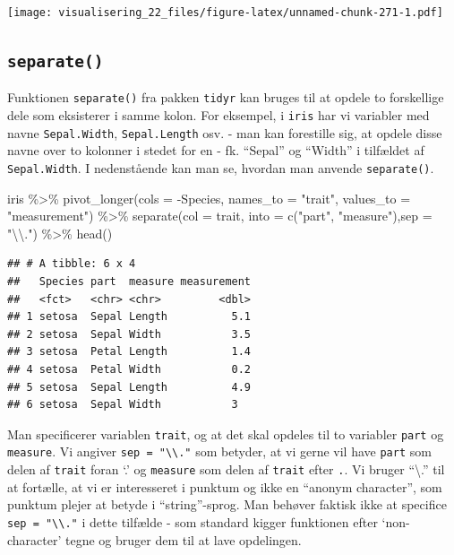\documentclass[
]{book}
\newenvironment{Shaded}{\begin{snugshade}}{\end{snugshade}}
\newcommand{\AttributeTok}[1]{\textcolor[rgb]{0.77,0.63,0.00}{#1}}
\newcommand{\FunctionTok}[1]{\textcolor[rgb]{0.00,0.00,0.00}{#1}}
\newcommand{\NormalTok}[1]{#1}
\newcommand{\SpecialCharTok}[1]{\textcolor[rgb]{0.00,0.00,0.00}{#1}}
\newcommand{\StringTok}[1]{\textcolor[rgb]{0.31,0.60,0.02}{#1}}
\begin{document}
\texttt{[image: visualisering\_22\_files/figure-latex/unnamed-chunk-271-1.pdf]}

\hypertarget{separate}{%
\subsection{\texorpdfstring{\texttt{separate()}}{separate()}}\label{separate}}

Funktionen \texttt{separate()} fra pakken \texttt{tidyr} kan bruges til at opdele to forskellige dele som eksisterer i samme kolon. For eksempel, i \texttt{iris} har vi variabler med navne \texttt{Sepal.Width}, \texttt{Sepal.Length} osv. - man kan forestille sig, at opdele disse navne over to kolonner i stedet for en - fk. ``Sepal'' og ``Width'' i tilfældet af \texttt{Sepal.Width}. I nedenstående kan man se, hvordan man anvende \texttt{separate()}.

\begin{Shaded}
\begin{Highlighting}[]
\NormalTok{iris }\SpecialCharTok{\%\textgreater{}\%}
  \FunctionTok{pivot\_longer}\NormalTok{(}\AttributeTok{cols =} \SpecialCharTok{{-}}\NormalTok{Species, }\AttributeTok{names\_to =} \StringTok{"trait"}\NormalTok{, }\AttributeTok{values\_to =} \StringTok{"measurement"}\NormalTok{) }\SpecialCharTok{\%\textgreater{}\%}
  \FunctionTok{separate}\NormalTok{(}\AttributeTok{col =}\NormalTok{ trait, }\AttributeTok{into =} \FunctionTok{c}\NormalTok{(}\StringTok{"part"}\NormalTok{, }\StringTok{"measure"}\NormalTok{),}\AttributeTok{sep =} \StringTok{"}\SpecialCharTok{\textbackslash{}\textbackslash{}}\StringTok{."}\NormalTok{) }\SpecialCharTok{\%\textgreater{}\%} 
  \FunctionTok{head}\NormalTok{()}
\end{Highlighting}
\end{Shaded}

\begin{verbatim}
## # A tibble: 6 x 4
##   Species part  measure measurement
##   <fct>   <chr> <chr>         <dbl>
## 1 setosa  Sepal Length          5.1
## 2 setosa  Sepal Width           3.5
## 3 setosa  Petal Length          1.4
## 4 setosa  Petal Width           0.2
## 5 setosa  Sepal Length          4.9
## 6 setosa  Sepal Width           3
\end{verbatim}

Man specificerer variablen \texttt{trait}, og at det skal opdeles til to variabler \texttt{part} og \texttt{measure}. Vi angiver \texttt{sep\ =\ "\textbackslash{}\textbackslash{}."} som betyder, at vi gerne vil have \texttt{part} som delen af \texttt{trait} foran `.' og \texttt{measure} som delen af \texttt{trait} efter \texttt{.}. Vi bruger ``\textbackslash.'' til at fortælle, at vi er interesseret i punktum og ikke en ``anonym character'', som punktum plejer at betyde i ``string''-sprog. Man behøver faktisk ikke at specifice \texttt{sep\ =\ "\textbackslash{}\textbackslash{}."} i dette tilfælde - som standard kigger funktionen efter `non-character' tegne og bruger dem til at lave opdelingen.
\end{document}
